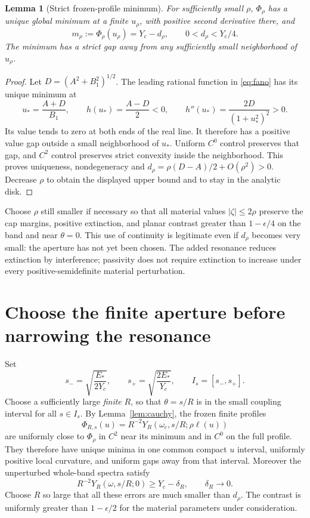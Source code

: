 \documentclass[11pt]{article}
\newtheorem{lemma}{Lemma}
\newcommand{\abs}[1]{\left|#1\right|}
\begin{document}
\begin{lemma}[Strict frozen-profile minimum]\label{lem:fano}
For sufficiently small $\rho$, $\Phi_\rho$ has a unique global minimum
at a finite $u_\rho$, with positive second derivative there, and
\[
 m_\rho:=\Phi_\rho(u_\rho)=Y_c-d_\rho,\qquad
 0<d_\rho<Y_c/4.
\]
The minimum has a strict gap away from any sufficiently small neighborhood
of $u_\rho$.
\end{lemma}
\begin{proof}
Let $D=(A^2+B_1^2)^{1/2}$. The leading rational function in
\eqref{eq:fano} has its unique minimum at
\[
 u_*=\frac{A+D}{B_1},\qquad
 h(u_*)=\frac{A-D}{2}<0,\qquad
 h''(u_*)=\frac{2D}{(1+u_*^2)^2}>0.
\]
Its value tends to zero at both ends of the real line. It therefore has a
positive value gap outside a small neighborhood of $u_*$. Uniform $C^0$
control preserves that gap, and $C^2$ control preserves strict convexity
inside the neighborhood. This proves uniqueness, nondegeneracy and
$d_\rho=\rho(D-A)/2+O(\rho^2)>0$. Decrease $\rho$ to obtain the displayed
upper bound and to stay in the analytic disk.
\end{proof}

Choose $\rho$ still smaller if necessary so that all material values
$\abs\zeta\le2\rho$ preserve the cap margins, positive extinction, and planar
contrast greater than $1-\epsilon/4$ on the band and near $\theta=0$.
This use of continuity is legitimate even if $d_\rho$ becomes very small:
the aperture has not yet been chosen. The added resonance reduces extinction
by interference; passivity does not require extinction to increase under every
positive-semidefinite material perturbation.

\section{Choose the finite aperture before narrowing the resonance}
Set
\[
 s_-=\sqrt{\frac{E_*}{2Y_c}},\qquad
 s_+=\sqrt{\frac{2E_*}{Y_c}},\qquad I_s=[s_-,s_+].
\]
Choose a sufficiently large \emph{finite} $R$, so that $\theta=s/R$ is in the
small coupling interval for all $s\in I_s$.
By Lemma~\ref{lem:cauchy}, the frozen finite profiles
\[
 \Phi_{R,s}(u)=R^{-2}Y_R(\omega_c,s/R;\rho\ell(u))
\]
are uniformly close to $\Phi_\rho$ in $C^2$ near its minimum and in $C^0$
on the full profile. They therefore have unique minima in one common compact
$u$ interval, uniformly positive local curvature, and uniform gaps away from
that interval. Moreover the unperturbed whole-band spectra satisfy
\[
 R^{-2}Y_R(\omega,s/R;0)\ge Y_c-\delta_R,\qquad
 \delta_R\longrightarrow0.
\]
Choose $R$ so large that all these errors are much smaller than $d_\rho$.
The contrast is uniformly greater than $1-\epsilon/2$ for the material
parameters under consideration.
\end{document}
